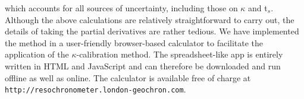\documentclass{article}
\begin{document}
which accounts for all sources of uncertainty, including those on
$\kappa$ and t$_s$.\\

Although the above calculations are relatively straightforward to
carry out, the details of taking the partial derivatives are rather
tedious. We have implemented the method in a user-friendly
browser-based calculator to facilitate the application of the
$\kappa$-calibration method. The spreadsheet-like app is entirely
written in HTML and JavaScript and can therefore be downloaded and run
offline as well as online. The calculator is available free of charge
at \\{\tt http://resochronometer.london-geochron.com}.



\end{document}
